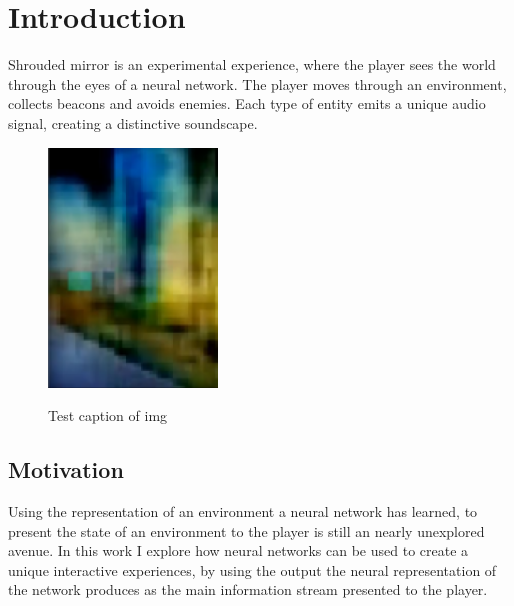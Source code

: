 \documentclass[a4paper, twoside, 10pt]{report}
\makeatletter
\newcommand{\figsourcefont}{\footnotesize}
\newcommand{\figsource}[1]{%
  \addtocontents{lof}{%
    {\leftskip\cftfigindent
     \advance\leftskip\cftfignumwidth
     \rightskip\@tocrmarg
     \figsourcefont#1\protect\par}%
  }%
 }
\makeatother
\begin{document}
\tableofcontents

\clearpage




\chapter{Introduction}
Shrouded mirror is an experimental experience, where the player sees the world through the eyes of a neural network. The player moves through an environment, collects beacons and avoids enemies. Each type of entity emits a unique audio signal, creating a distinctive soundscape.
\begin{figure}[hbt]
\centering
 {\caption{Test caption of img}
    \figsource{Own graphic}}
{\includegraphics[width=0.4\textwidth]{Images/FrontCover.png}}
\end{figure}

\section{Motivation}
Using the representation of an environment a neural network has learned, to present the state of an environment to the player is still an nearly unexplored avenue. 
In this work I explore how neural networks can be used to create a unique interactive experiences, by using the output the neural representation of the network produces as the main information stream presented to the player.
\end{document}

